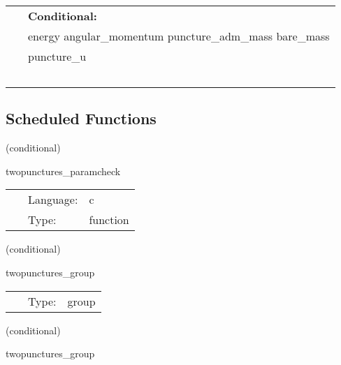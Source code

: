 \hspace{5mm}

 \begin{tabular*}{160mm}{ll} 
~& {\bf Conditional:} \\ 
~ &  energy angular\_momentum puncture\_adm\_mass bare\_mass\\ 
~ &  puncture\_u\\ 
~ & ~\\ 
\end{tabular*} 


\subsection*{Scheduled Functions}
\vspace{5mm}

   (conditional) 

\hspace{5mm} twopunctures\_paramcheck 

\hspace{5mm}{\it check parameters and thorn needs } 


\hspace{5mm}

 \begin{tabular*}{160mm}{cll} 
~ & Language:  & c \\ 
~ & Type:  & function \\ 
\end{tabular*} 


\vspace{5mm}

   (conditional) 

\hspace{5mm} twopunctures\_group 

\hspace{5mm}{\it twopunctures initial data group } 


\hspace{5mm}

 \begin{tabular*}{160mm}{cll} 
~ & Type:  & group \\ 
\end{tabular*} 


\vspace{5mm}

   (conditional) 

\hspace{5mm} twopunctures\_group 

